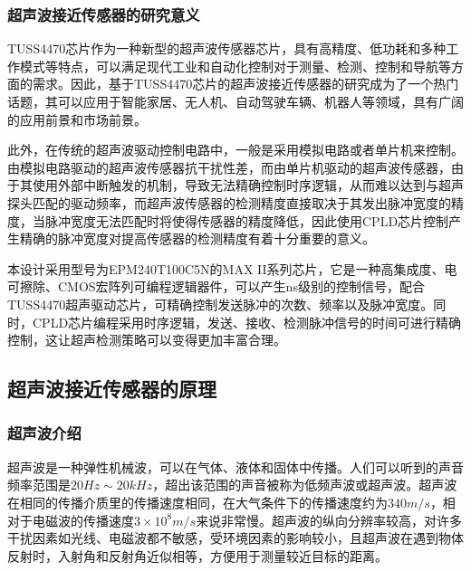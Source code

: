     \subsubsection{超声波接近传感器的研究意义}
    TUSS4470芯片作为一种新型的超声波传感器芯片，具有高精度、低功耗和多种工作模式等特点，可以满足现代工业和自动化控制对于测量、检测、控制和导航等方面的需求。因此，基于TUSS4470芯片的超声波接近传感器的研究成为了一个热门话题，其可以应用于智能家居、无人机、自动驾驶车辆、机器人等领域，具有广阔的应用前景和市场前景。\par
    此外，在传统的超声波驱动控制电路中，一般是采用模拟电路或者单片机来控制。由模拟电路驱动的超声波传感器抗干扰性差，而由单片机驱动的超声波传感器，由于其使用外部中断触发的机制，导致无法精确控制时序逻辑，从而难以达到与超声探头匹配的驱动频率，而超声波传感器的检测精度直接取决于其发出脉冲宽度的精度，当脉冲宽度无法匹配时将使得传感器的精度降低，因此使用CPLD芯片控制产生精确的脉冲宽度对提高传感器的检测精度有着十分重要的意义。\par
    本设计采用型号为EPM240T100C5N的MAX II系列芯片，它是一种高集成度、电可擦除、CMOS宏阵列可编程逻辑器件，可以产生ns级别的控制信号，配合TUSS4470超声驱动芯片，可精确控制发送脉冲的次数、频率以及脉冲宽度。同时，CPLD芯片编程采用时序逻辑，发送、接收、检测脉冲信号的时间可进行精确控制，这让超声检测策略可以变得更加丰富合理。
    \subsection{超声波接近传感器的原理}
    \subsubsection{超声波介绍}
      超声波是一种弹性机械波，可以在气体、液体和固体中传播。人们可以听到的声音频率范围是$20Hz\sim20kHz$，超出该范围的声音被称为低频声波或超声波。超声波在相同的传播介质里的传播速度相同，在大气条件下的传播速度约为$340m/s$，相对于电磁波的传播速度$3\times10^8m/s$来说非常慢。超声波的纵向分辨率较高，对许多干扰因素如光线、电磁波都不敏感，受环境因素的影响较小，且超声波在遇到物体反射时，入射角和反射角近似相等，方便用于测量较近目标的距离。
      

